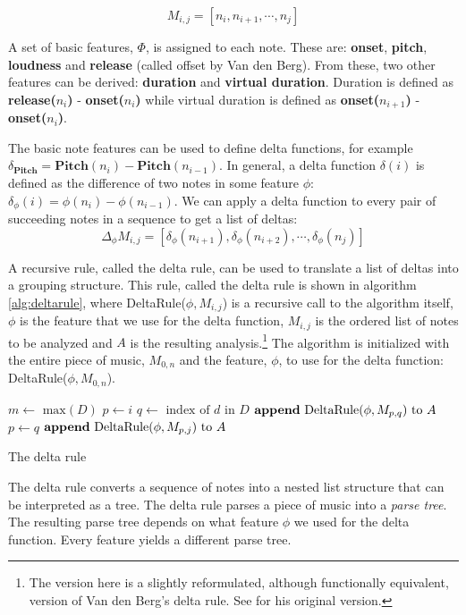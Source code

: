 \documentclass[a4paper,10pt]{article}
\begin{document}
\[M_{i,j} = [n_i, n_{i+1}, \cdots, n_j]\]

A set of basic features, $\Phi$, is assigned to each note. These are: \textbf{onset}, \textbf{pitch}, \textbf{loudness} and \textbf{release} (called offset by Van den Berg). From these, two other features can be derived: \textbf{duration} and \textbf{virtual duration}. Duration is defined as \textbf{release($n_i$)} - \textbf{onset($n_i$)} while virtual duration is defined as \textbf{onset($n_{i+1}$)} - \textbf{onset($n_i$)}. 

The basic note features can be used to define delta functions, for example $\delta_{\textbf{Pitch}} = \textbf{Pitch}(n_i) - \textbf{Pitch}(n_{i-1})$. In general, a delta function $\delta(i)$ is defined as the difference of two notes in some feature $\phi$: $\delta_{\phi}(i) = \phi(n_i) - \phi(n_{i-1})$. We can apply a delta function to every pair of succeeding notes in a sequence to get a list of deltas: 
\[\Delta_{\phi} M_{i,j} = [\delta_{\phi}(n_{i+1}), \delta_{\phi}(n_{i+2}), \cdots, \delta_{\phi}(n_{j})]\]

A recursive rule, called the delta rule, can be used to translate a list of deltas into a grouping structure. This rule, called the delta rule is shown in algorithm \ref{alg:deltarule}, where DeltaRule($\phi, M_{i,j}$) is a recursive call to the algorithm itself, $\phi$ is the feature that we use for the delta function, $M_{i,j}$ is the ordered list of notes to be analyzed and $A$ is the resulting analysis.\footnote{The version here is a slightly reformulated, although functionally equivalent, version of Van den Berg's delta rule. See \cite{markwin} for his original version.} The algorithm is initialized with the entire piece of music, $M_{0, n}$ and the feature, $\phi$, to use for the delta function: DeltaRule($\phi, M_{0,n}$).
\begin{algorithm}
\begin{algorithmic}
\STATE $m \leftarrow \mbox{ max}(D)$
\STATE $p \leftarrow i$
\STATE $q \leftarrow \mbox{ index of }d \mbox{ in } D$
\STATE $\mbox{\textbf{append} DeltaRule(}\phi, M_{p,q}\mbox{) to } A$
\STATE $p \leftarrow q$
\ENDIF
\ENDFOR
\STATE $\mbox{\textbf{append} DeltaRule(}\phi, M_{p,j}\mbox{) to } A$
\end{algorithmic}
\caption{The delta rule}
\label{alg:deltarule}
\end{algorithm}

The delta rule converts a sequence of notes into a nested list structure that can be interpreted as a tree. The delta rule parses a piece of music into a \textit{parse tree}. The resulting parse tree depends on what feature $\phi$ we used for the delta function. Every feature yields a different parse tree.
\end{document}
